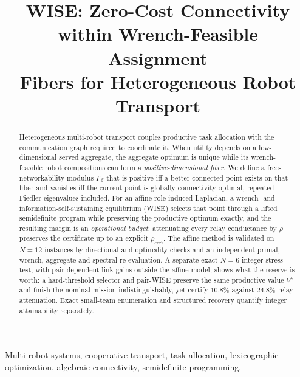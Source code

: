 \documentclass[conference]{IEEEtran}
\newcommand{\Emanifold}{\mathcal{E}}          %
\begin{document}
\title{WISE: Zero-Cost Connectivity within Wrench-Feasible Assignment\\
Fibers for Heterogeneous Robot Transport}

\author{
}

\maketitle

\begin{abstract}
Heterogeneous multi-robot transport couples productive task allocation with the communication
graph required to coordinate it. When utility depends on a low-dimensional served aggregate,
the aggregate optimum is unique while its wrench-feasible robot compositions can form a
\emph{positive-dimensional fiber}. We define a free-networkability modulus $\Gamma_{\Emanifold}$
that is positive iff a better-connected point exists on that fiber and vanishes iff the current
point is globally connectivity-optimal, repeated Fiedler eigenvalues included. For an affine role-induced Laplacian, a wrench- and
information-self-sustaining equilibrium (WISE) selects that point through a lifted semidefinite
program while preserving the productive optimum exactly, and the resulting margin is an
\emph{operational budget}: attenuating every relay conductance by $\rho$ preserves the
certificate up to an explicit $\rho_{\mathrm{cert}}$. The affine method is validated on
$N{=}12$ instances by directional and optimality checks and an independent primal, wrench,
aggregate and spectral re-evaluation. A separate exact
$N{=}6$ integer stress test, with pair-dependent link gains outside the affine model, shows
what the reserve is worth: a hard-threshold selector and pair-WISE preserve the same productive
value $V^{\star}$ and finish the nominal mission indistinguishably, yet certify $10.8\%$
against $24.8\%$ relay attenuation. Exact small-team enumeration and
structured recovery quantify integer attainability separately.
\end{abstract}

\begin{IEEEkeywords}
Multi-robot systems, cooperative transport, task allocation, lexicographic optimization,
algebraic connectivity, semidefinite programming.
\end{IEEEkeywords}










\end{document}
